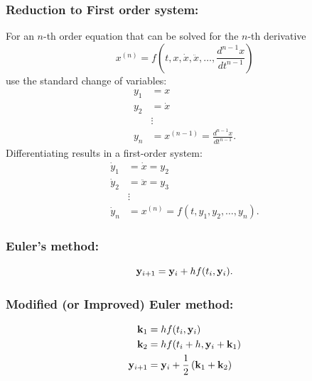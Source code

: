 \subsubsection*{Reduction to First order system:}
For an $n$-th order equation that can be solved for the
$n$-th derivative
\begin{equation}
x^{(n)} = f\left(t,x,\dot{x},\ddot{x}, \ldots,
                   \frac{d^{n-1}x}{dt^{n-1}}\right)
\end{equation}
use the standard change of variables:
\begin{equation}
\begin{split}
y_1 &= x\\
y_2 &= \dot{x}\\
   & \vdots \\
y_n & = x^{(n-1)} = \frac{d^{n-1}x}{dt^{n-1}}.
\end{split}
\end{equation}
Differentiating results in a first-order system:
\begin{equation}
\begin{split}
\dot{y}_1 &= \dot{x} = y_2\\
\dot{y}_2 &= \ddot{x} = y_3\\
   & \vdots \\
\dot{y}_n &= x^{(n)} = f(t,y_1,y_2,\ldots,y_n).
\end{split}
\end{equation}

\subsubsection*{Euler's method:}
\begin{equation*}
\mathbf{y}_{i+1} = \mathbf{y}_i + h f(t_i,\mathbf{y}_i).
\end{equation*}

\subsubsection*{Modified (or Improved) Euler method:}
\begin{equation*}
\begin{split}
\mathbf{k}_1 &= h f(t_i,\mathbf{y}_i)\\
\mathbf{k}_2 &= h f(t_i+h, \mathbf{y}_i + \mathbf{k}_1)\\
\mathbf{y}_{i+1} &= \mathbf{y}_i +  \frac{1}{2} \left(\mathbf{k}_1 + \mathbf{k}_2 \right)
\end{split}
\end{equation*}


